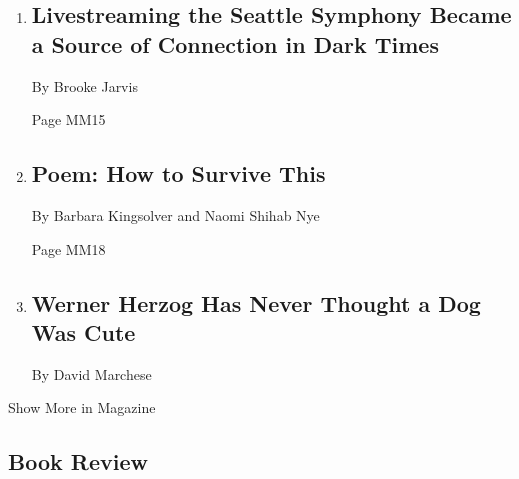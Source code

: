 \begin{enumerate}
\def\labelenumi{\arabic{enumi}.}
\item
  \href{/2020/03/24/magazine/coronavirus-music-live-stream-concert.html}{}

  \hypertarget{livestreaming-the-seattle-symphony-became-a-source-of-connection-in-dark-times}{%
  \subsection{Livestreaming the Seattle Symphony Became a Source of
  Connection in Dark
  Times}\label{livestreaming-the-seattle-symphony-became-a-source-of-connection-in-dark-times}}

  By Brooke Jarvis

  Page MM15
\item
  \href{/2020/03/26/magazine/poem-how-to-survive-this.html}{}

  \hypertarget{poem-how-to-survive-this}{%
  \subsection{Poem: How to Survive
  This}\label{poem-how-to-survive-this}}

  By Barbara Kingsolver and Naomi Shihab Nye

  Page MM18
\item
  \href{/interactive/2020/03/23/magazine/werner-herzog-interview.html}{}

  \hypertarget{werner-herzog-has-never-thought-a-dog-was-cute}{%
  \subsection{Werner Herzog Has Never Thought a Dog Was
  Cute}\label{werner-herzog-has-never-thought-a-dog-was-cute}}

  By David Marchese
\end{enumerate}

Show More in Magazine

\hypertarget{book-review}{%
\subsection{Book Review}\label{book-review}}

